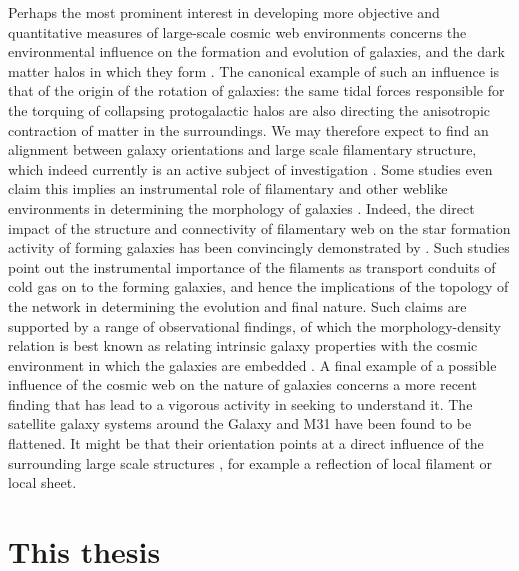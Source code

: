 Perhaps the most prominent interest in developing more objective and quantitative measures of large-scale cosmic web 
environments concerns the environmental influence on the formation and evolution of galaxies, and the dark matter 
halos in which they form \citep[see e.g.][]{Hahn2007b, Cautun2014a}. The canonical example of such 
an influence is that of the origin of the rotation of galaxies: the same tidal forces responsible for the torquing of collapsing 
protogalactic halos \citep{Hoyle1951,Peebles1969,Doroshkevich1970} are also directing the anisotropic contraction of matter in 
the surroundings. We may therefore expect to find an alignment between galaxy orientations and large scale filamentary 
structure, which indeed currently is an active subject of investigation \citep[e.g.][]{Aragon-Calvo2007,Leepen2000,Jones2010,Codis2012,
tempel2013,Trowland2013,Hirv2017}. Some studies even claim this implies an instrumental 
role of filamentary and other weblike environments in determining 
the morphology of galaxies \citep[see e.g.][for a short review]{Pichon2016}. Indeed, the direct impact of the structure and 
connectivity of filamentary web on the star formation activity of forming galaxies has been convincingly demonstrated 
by \citet[][see also \citealt{2015MNRAS.449.2087D,2015MNRAS.454..637G,Aragon-Calvo2016}]{Dekel2009b}. Such studies point out the instrumental importance of the filaments as transport conduits of cold 
gas on to the forming galaxies, and hence the implications of the topology of the network in determining the evolution and 
final nature. Such claims are supported by a range of observational findings, of which the morphology-density relation 
\citep{Dressler1980} is best known as relating intrinsic galaxy properties with the cosmic environment in which the 
galaxies are embedded \citep[see e.g.][]{Kuutma2017}. A final example of a possible influence of the cosmic web on the nature of 
galaxies concerns a more recent finding that has lead to a vigorous activity in seeking to understand it. The satellite galaxy 
systems around the Galaxy and M31 have been found to be flattened. It might be that their orientation points at a direct influence 
of the surrounding large scale structures \citep[see][]{Ibata2013,Cautun2015,Forero-Romero2014,Gonzalez2016}, for example a reflection of local filament or local sheet.


\section{This thesis}

